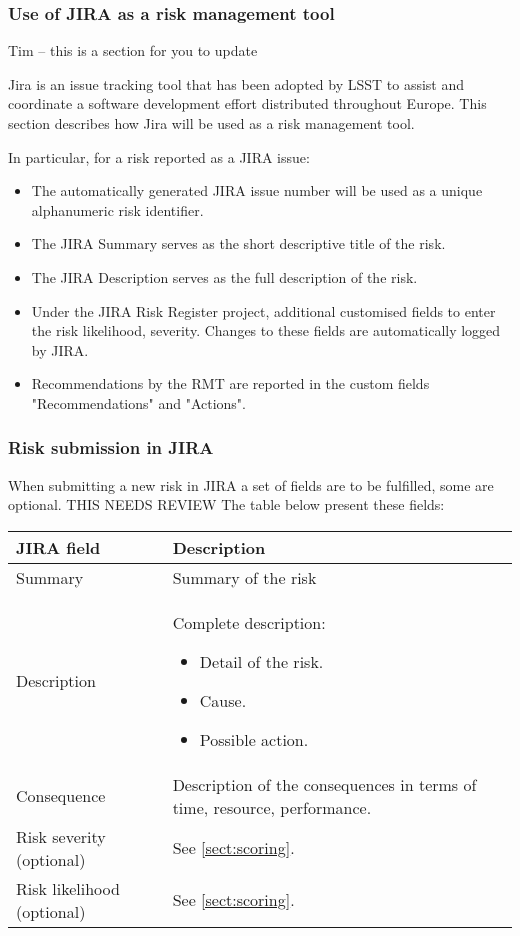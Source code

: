 \subsubsection{Use of JIRA as a risk management tool}

{\color{red} Tim -- this is a section for you to update}


Jira is an issue tracking tool that has been adopted by LSST to assist and coordinate a software development effort distributed throughout Europe. This section describes how Jira will be used as a risk management tool.

In particular, for a risk reported as a JIRA issue:
\begin{itemize}
\item The automatically generated JIRA issue number will be used as a unique alphanumeric risk identifier.
\item The JIRA Summary serves as the short descriptive title of the risk.
\item The JIRA Description serves as the full description of the risk.
\item Under the JIRA Risk Register project, additional customised fields to enter the risk likelihood, severity. Changes to these fields are automatically logged by JIRA.
\item Recommendations by the RMT are reported in the custom fields "Recommendations" and "Actions".
\end{itemize}


\subsubsection{Risk submission in JIRA}

 When submitting a new risk in JIRA a set of fields are to be fulfilled, some are optional.
{\color{red} THIS NEEDS REVIEW}
 The table below present these fields:
\begin{longtable}{|l|p{}|}\hline
{\bf JIRA field} & {\bf Description} \\ \hline
Summary    & Summary of the risk  \\ \hline
Description    & Complete description:
\begin{itemize}
  \item Detail of the risk.
  \item Cause.
  \item Possible action.
\end{itemize}
\\
\hline
Consequence  & Description of the consequences in terms of time, resource, performance.\\
\hline
Risk severity (optional)   & See \ref{sect:scoring}. \\
\hline
Risk likelihood (optional)   & See \ref{sect:scoring}. \\
\hline
\end{longtable}

